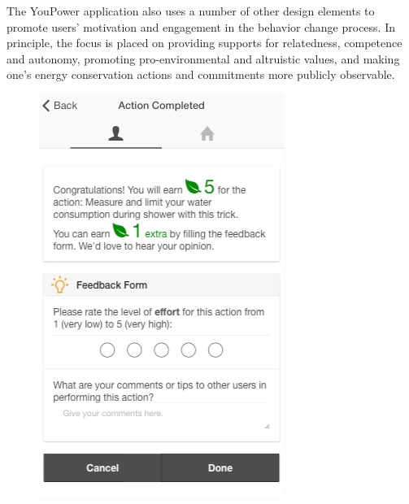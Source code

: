 The YouPower application also uses a number of other design elements to promote users' motivation and engagement in the behavior change process. In principle, the focus is placed on providing supports for relatedness, competence and autonomy, promoting pro-environmental and altruistic values, and making one's energy conservation actions and commitments more publicly observable. 

\begin{figure}[t!]
      \begin{center}
        \begin{minipage}[t!]{0.4\linewidth}
	       \includegraphics[width=1\linewidth]{img/action_completed.jpg}

\end{minipage}
\end{center}
\end{figure}
